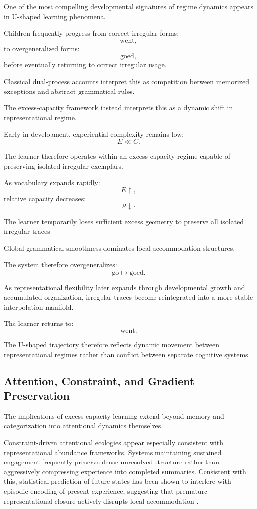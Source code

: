 \documentclass[12pt,a4paper]{article}
\begin{document}
One of the most compelling developmental signatures of regime dynamics appears in U-shaped learning phenomena.

Children frequently progress from correct irregular forms:
\[
\text{went},
\]
to overgeneralized forms:
\[
\text{goed},
\]
before eventually returning to correct irregular usage.

Classical dual-process accounts interpret this as competition between memorized exceptions and abstract grammatical rules.

The excess-capacity framework instead interprets this as a dynamic shift in representational regime.

Early in development, experiential complexity remains low:
\[
E \ll C.
\]

The learner therefore operates within an excess-capacity regime capable of preserving isolated irregular exemplars.

As vocabulary expands rapidly:
\[
E \uparrow,
\]
relative capacity decreases:
\[
\rho \downarrow.
\]

The learner temporarily loses sufficient excess geometry to preserve all isolated irregular traces.

Global grammatical smoothness dominates local accommodation structures.

The system therefore overgeneralizes:
\[
\text{go}
\mapsto
\text{goed}.
\]

As representational flexibility later expands through developmental growth and accumulated organization, irregular traces become reintegrated into a more stable interpolation manifold.

The learner returns to:
\[
\text{went}.
\]

The U-shaped trajectory therefore reflects dynamic movement between representational regimes rather than conflict between separate cognitive systems.

\subsection{Attention, Constraint, and Gradient Preservation}

The implications of excess-capacity learning extend beyond memory and categorization into attentional dynamics themselves.

Constraint-driven attentional ecologies appear especially consistent with representational abundance frameworks. Systems maintaining sustained engagement frequently preserve dense unresolved structure rather than aggressively compressing experience into completed summaries. Consistent with this, statistical prediction of future states has been shown to interfere with episodic encoding of present experience, suggesting that premature representational closure actively disrupts local accommodation \cite{Sherman2020}.
\end{document}
